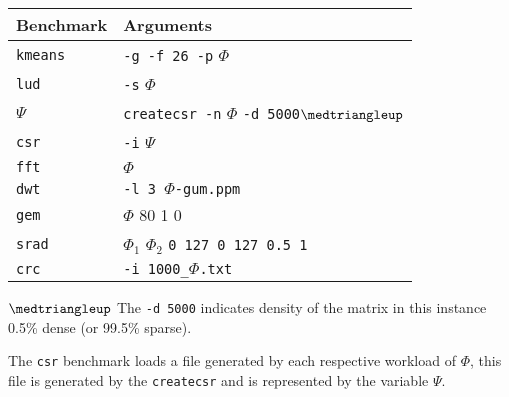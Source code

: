 \documentclass[../document.tex]{subfiles}
\begin{document}
\begin{table}[t]
	\centering
	\begin{threeparttable}
		\centering
		\vspace{0pt}
		\begin{tabular}{l|l}
			\bf Benchmark & \bf Arguments\\\hline
			{\tt kmeans} & {\tt -g -f 26 -p} $\Phi$\\
			{\tt lud} & {\tt -s} $\Phi$\\
			$\Psi$ & {\tt createcsr -n} $\Phi$ {\tt -d 5000}$\medtriangleup$\\
			{\tt csr}\textdagger & {\tt -i} $\Psi$\\
			{\tt fft} & $\Phi$ \\
			{\tt dwt} & {\tt -l 3 }$\Phi${\tt-gum.ppm}\\
			{\tt gem} & $\Phi$ {80 1 0}\\
			{\tt srad}& $\Phi_1$ $\Phi_2$ {\tt 0 127 0 127 0.5 1}\\
			{\tt crc}&  {\tt -i 1000\_}$\Phi${\tt.txt}\\
		\end{tabular}
		\begin{tablenotes}
			\item [$\medtriangleup$] The {\tt -d 5000} indicates density of the matrix in this instance 0.5\% dense (or 99.5\% sparse).
			\item [\textdagger] The {\tt csr} benchmark loads a file generated by each respective workload of $\Phi$, this file is generated by the {\tt createcsr} and is represented by the variable $\Psi$.
		\end{tablenotes}
		\label{tab:program_arguments}
	\end{threeparttable}
\end{table}
\end{document}
